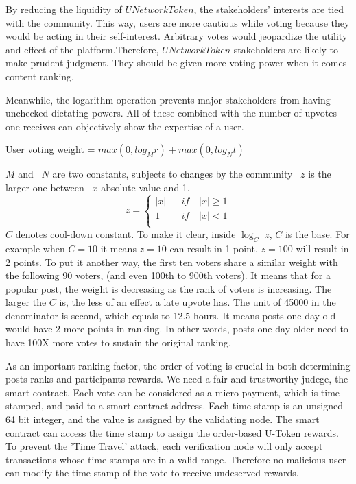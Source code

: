 By reducing the liquidity of $UNetworkToken$, the stakeholders' interests are tied with the community. This way, users are more cautious while voting because they would be acting in their self-interest. Arbitrary votes would jeopardize the utility and effect of the platform.Therefore, $UNetworkToken$ stakeholders are likely to make prudent judgment. They should be given more voting power when it comes content ranking. \par
Meanwhile, the logarithm operation prevents major stakeholders from having unchecked dictating powers.
All of these combined with the number of upvotes one receives can objectively show the expertise of a user. 
\begin{center}
        User voting weight = $max(0, log_M r) + max (0, log_N t)$
\end{center}
$M$ and \ $N$ are two constants, subjects to changes by the community
\ $z$ is the larger one between \ $x$ absolute value and 1.
$$z =\left\{
\begin{array}{rcl}
|x|       &      & {if \quad |x| \geq 1}\\
1     &      & {if \quad |x| < 1}\\
\end{array} \right. $$
$C$ denotes cool-down constant. To make it clear, inside $\log_{C}$ $z$, $C$ is the base. For example when $C = 10$ it means $z = 10$ can result in 1 point, $z = 100$ will result in 2 points. To put it another way, the first ten voters share a similar weight with the following 90 voters, (and even 100th to 900th voters). It means that for a popular post, the weight is decreasing as the rank of voters is increasing. The larger the $C$ is, the less of an effect a late upvote has.
The unit of 45000 in the denominator is second, which equals to 12.5 hours. It means posts one day old would have 2 more points in ranking. In other words, posts one day older need to have 100X more votes to sustain the original ranking.  

As an important ranking factor, the order of voting is crucial in both determining posts ranks and participants rewards. We need a fair and trustworthy judege, the smart contract. Each vote can be considered as a micro-payment, which is time-stamped, and paid to a smart-contract address. Each time stamp is an unsigned 64 bit integer, and the value is assigned by the validating node. The smart contract can access the time stamp to assign the order-based U-Token rewards. To prevent the 'Time Travel' attack, each verification node will only accept transactions whose time stamps are in a valid range. Therefore no malicious user can modify the time stamp of the vote to receive undeserved rewards.  

